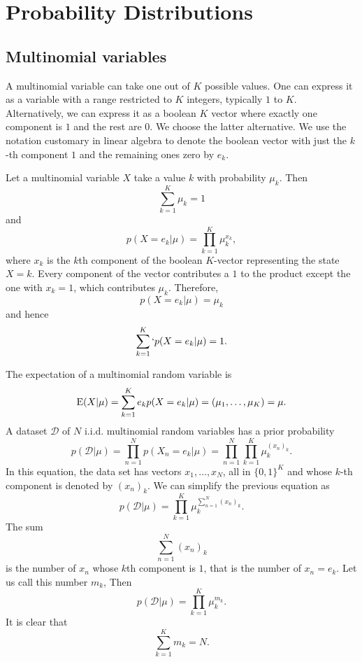 \chapter{Probability Distributions}\label{c2}
\section{Multinomial variables}\label{c2s1}
A multinomial variable can take one out of $K$ possible values. One can express it as a variable
with a range restricted to $K$ integers, typically $1$ to $K$. Alternatively, we can express it as 
a boolean  $K$ vector where exactly one component is $1$ and the rest are $0$. We choose the latter 
alternative. We use the notation customary in linear algebra to denote the boolean vector with just 
the $k$-th component $1$ and the remaining ones zero by $e_k$.

Let a multinomial variable $X$ take a value $k$ with probability $\mu_k$. Then 
\[
\sum_{k=1}^K \mu_k = 1
\]
and 
\begin{equation}\label{c2s1e1}
p(X = e_k|\mu) = \prod_{k=1}^K \mu_k^{x_k},
\end{equation}
where $x_k$ is the $k$th component of the boolean $K$-vector representing the state
$X = k$. Every component of the vector contributes a $1$ to the product except the
one with $x_k = 1$, which contributes $\mu_k$. Therefore,
\[
p(X = e_k|\mu) = \mu_k
\]
and hence
\begin{equation}\label{c2s1e2}
\sum_{k=1}^K`p(X = e_k|\mu) = 1.
\end{equation}

The expectation of a multinomial random variable is
\begin{equation}\label{c2s1e3}
\operatorname{E}(X|\mu) = \sum_{k=1}^K e_kp(X = e_k|\mu) = (\mu_1, \ldots, \mu_K) = \mu.
\end{equation}
A dataset $\mathcal{D}$ of $N$ i.i.d. multinomial random variables has a prior probability
\[
p(\mathcal{D}|\mu) = \prod_{n=1}^Np(X_n = e_k|\mu) = \prod_{n=1}^N\prod_{k=1}^K \mu_k^{(x_n)_k}.
\]
In this equation, the data set has vectors ${x_1, \ldots, x_N}$, all in $\{0, 1\}^K$ and whose
$k$-th component is denoted by $(x_n)_k$. We can simplify the previous equation as
\[
p(\mathcal{D}|\mu) = \prod_{k=1}^K \mu_k^{\sum_{n=1}^N (x_n)_k}.
\]
The sum 
\[
\sum_{n=1}^N (x_n)_k
\]
is the number of $x_n$ whose $k$th component is $1$, that is the number of $x_n = e_k$. Let
us call this number $m_k$, Then
\begin{equation}\label{c2s1e4}
p(\mathcal{D}|\mu) = \prod_{k=1}^K \mu_k^{m_k}.
\end{equation}
It is clear that 
\begin{equation}\label{c2s1e5}
\sum_{k=1}^K m_k = N.
\end{equation}


